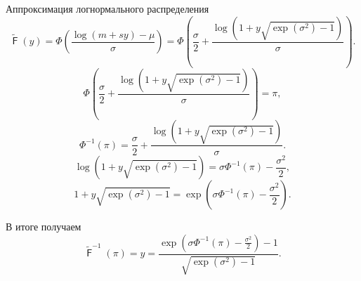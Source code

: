 \documentclass[ucs, notheorems, handout]{beamer}
\DeclareMathOperator{\F}{\mathsf{F}}
\begin{document}
\begin{frame}{Аппроксимация логнормального распределения}
	\begin{equation*}
		\displaystyle{\tilde{\F}(y) = \Phi \left(\frac{\log(m+sy)-\mu }{\sigma }\right) = \Phi \left(\frac{\sigma }{2} + \frac{\log(1+y\sqrt{\exp(\sigma ^{2})-1})}{\sigma}\right)}.
	\end{equation*}
	\begin{equation*}
		\displaystyle{\Phi \left(\frac{\sigma }{2} + \frac{\log(1+y\sqrt{\exp(\sigma ^{2})-1})}{\sigma }\right) = \pi},
	\end{equation*}
	\begin{equation*}
		\displaystyle{\Phi^{-1}(\pi)=\frac{\sigma }{2} + \frac{\log(1+y\sqrt{\exp(\sigma ^{2})-1})}{\sigma}}.
	\end{equation*}
	\begin{equation*}
		\displaystyle{\log(1+y\sqrt{\exp(\sigma ^{2})-1}) = \sigma\Phi^{-1}(\pi) - \frac{\sigma^{2} }{2}},
	\end{equation*}
	\begin{equation*}
		1+y\sqrt{\exp(\sigma ^{2})-1} = \exp(\sigma\Phi^{-1}(\pi) - \frac{\sigma^{2} }{2}).
	\end{equation*}
	
	В итоге получаем
	\begin{equation*}
		\displaystyle{\tilde{\F}^{-1}(\pi) = y = \frac{\exp(\sigma\Phi^{-1}(\pi) - \frac{\sigma^{2} }{2})-1}{\sqrt{\exp(\sigma ^{2})-1}}}.
	\end{equation*}

\end{frame}
	
\end{document}
